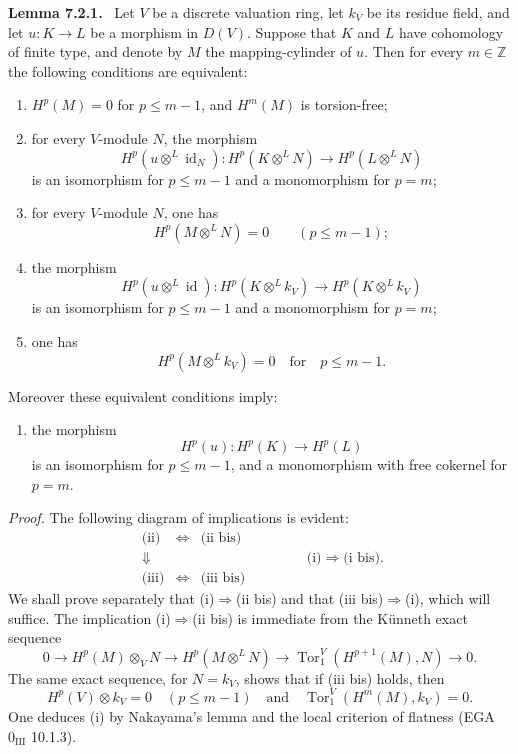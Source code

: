 \documentclass[11pt]{article}
\newenvironment{statement}[1]{\par\medskip\noindent\textbf{#1.}\ }{\par\medskip}
\begin{document}
\begin{statement}{Lemma 7.2.1}
Let $V$ be a discrete valuation ring, let $k_V$ be its residue field, and let $u:K\to L$ be a morphism in $D(V)$. Suppose that $K$ and $L$ have cohomology of finite type, and denote by $M$ the mapping-cylinder of $u$. Then for every $m\in\mathbb Z$ the following conditions are equivalent:
\begin{enumerate}[label=(\roman*)]
\item $H^p(M)=0$ for $p\le m-1$, and $H^m(M)$ is torsion-free;
\item for every $V$-module $N$, the morphism
\[
H^p(u\otimes^L\operatorname{id}_N):H^p(K\otimes^L N)\to H^p(L\otimes^L N)
\]
is an isomorphism for $p\le m-1$ and a monomorphism for $p=m$;
\item[(ii bis)] for every $V$-module $N$, one has
\[
H^p(M\otimes^L N)=0\qquad(p\le m-1);
\]
\item the morphism
\[
H^p(u\otimes^L\operatorname{id}):H^p(K\otimes^L k_V)\to H^p(K\otimes^L k_V)
\]
is an isomorphism for $p\le m-1$ and a monomorphism for $p=m$;
\item[(iii bis)] one has
\[
H^p(M\otimes^L k_V)=0\quad\text{for}\quad p\le m-1.
\]
\end{enumerate}
Moreover these equivalent conditions imply:
\begin{enumerate}[label=(\roman* bis)]
\item the morphism
\[
H^p(u):H^p(K)\to H^p(L)
\]
is an isomorphism for $p\le m-1$, and a monomorphism with free cokernel for $p=m$.
\end{enumerate}
\end{statement}

\emph{Proof.} The following diagram of implications is evident:
\[
\begin{array}{ccc}
\text{(ii)}&\Leftrightarrow&\text{(ii bis)}\\
\Downarrow&&\\
\text{(iii)}&\Leftrightarrow&\text{(iii bis)}
\end{array}
\qquad\qquad
\text{(i)}\Rightarrow\text{(i bis).}
\]
We shall prove separately that (i)$\Rightarrow$(ii bis) and that (iii bis)$\Rightarrow$(i), which will suffice. The implication (i)$\Rightarrow$(ii bis) is immediate from the Künneth exact sequence
\[
0\to H^p(M)\otimes_V N\to H^p(M\otimes^L N)\to \operatorname{Tor}_1^V(H^{p+1}(M),N)\to0.
\]
The same exact sequence, for $N=k_V$, shows that if (iii bis) holds, then
\[
H^p(V)\otimes k_V=0\quad(p\le m-1)\quad\text{and}\quad
\operatorname{Tor}_1^V(H^m(M),k_V)=0.
\]
One deduces (i) by Nakayama's lemma and the local criterion of flatness (EGA $0_{\mathrm{III}}$ 10.1.3).
\end{document}
